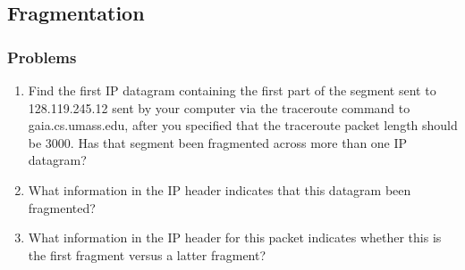 \subsection{Fragmentation}
    \subsubsection*{Problems}
    \begin{enumerate}[label=\bfseries Problem \arabic*:,leftmargin=*,labelindent=1em]
    \addtocounter{enumi}{8}
        \item Find the first IP datagram containing the first part of the segment sent to 128.119.245.12 sent by your computer via the traceroute command to gaia.cs.umass.edu, after you specified that the traceroute packet length should be 3000. Has that segment been fragmented across more than one IP datagram?\\[0.2mm]
        \soln
        \item What information in the IP header indicates that this datagram been fragmented? \\[0.2mm]
        \soln
        \item What information in the IP header for this packet indicates whether this is the first fragment versus a latter fragment?\\[0.2mm]
        \soln

\end{enumerate}
